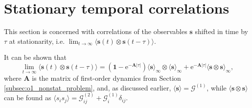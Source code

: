 \documentclass[a4paper, 11pt]{article}
\begin{document}
\section{Stationary temporal correlations}
This section is concerned with correlations of the observables $\mathbf s $ shifted in time by $\tau$ at stationarity, i.e. $\lim_{t\to\infty}\langle\mathbf{ s }(t)\otimes\mathbf{ s }(t-\tau)\rangle$.

It can be shown that
\begin{equation}
  \lim_{t\to\infty}\langle\mathbf{ s }(t)\otimes\mathbf{ s }(t-\tau)\rangle = (\mathbf 1-\mathrm e^{-\mathbf A|\tau|})\langle\mathbf s \rangle_\infty\otimes\langle\mathbf s \rangle_\infty + \mathrm e^{-\mathbf A|\tau|}\langle\mathbf s \otimes\mathbf s \rangle_\infty,
\end{equation}
where $\mathbf A$ is the matrix of first-order dynamics from Section \ref{subsec:o1_nonstat_problem}, and, as discussed earlier, $\langle\mathbf s \rangle = \mathbf{\mathcal G}^{(1)}$, while $\langle\mathbf s \otimes\mathbf s \rangle$ can be found as $\langle s _i s _j\rangle = {\mathcal G}^{(2)}_{ij} + \mathcal G^{(1)}_i\delta_{ij}$.




\end{document}
